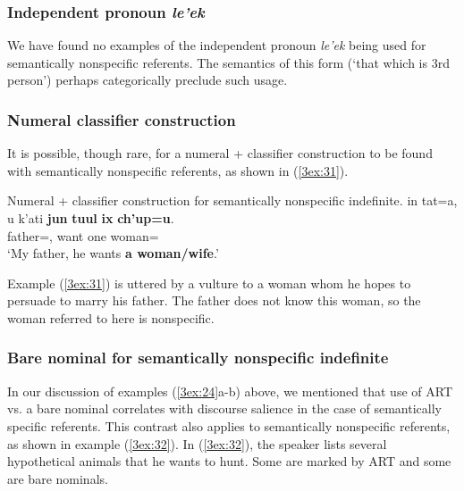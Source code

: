 \documentclass[output=paper]{langsci/langscibook}
\begin{document}
\subsubsection{Independent pronoun {\emph{le'ek}} }\label{3sec:353}

We have found no examples of the independent pronoun {\emph{le'ek}} being used for semantically nonspecific referents. The semantics of this form (`that which is 3rd person') perhaps categorically preclude such usage.

\subsubsection{Numeral classifier construction}\label{3sec:354}

It is possible, though rare, for a numeral + classifier construction to be found with semantically nonspecific referents, as shown in (\ref{3ex:31}).

\begin{exe}
\ex\label{3ex:31}
Numeral + classifier construction for semantically nonspecific indefinite. 
\exi{}
\gll	in 		tat=a, 			u 		k'ati 		{\bf{jun}} 	{\bf{tuul}} 		{\bf{ix}} 		{\bf{ch'up=u}}.  \\
	{}	father={},	{}	want		one		{}	{}		woman={} \\
\glt 	`My father, he wants {\bf{a woman/wife}}.'
\end{exe}

Example (\ref{3ex:31}) is uttered by a vulture to a woman whom he hopes to persuade to marry his father.  The father does not know this woman, so the woman referred to here is nonspecific.

\subsubsection{Bare nominal for semantically nonspecific indefinite}\label{3sec:355}

In our discussion of examples (\ref{3ex:24}a-b) above, we mentioned that use of ART vs. a bare nominal correlates with discourse salience in the case of semantically specific referents.  This contrast also applies to semantically nonspecific referents, as shown in example (\ref{3ex:32}). In (\ref{3ex:32}), the speaker lists several hypothetical animals that he wants to hunt.  Some are marked by ART and some are bare nominals.
\end{document}
